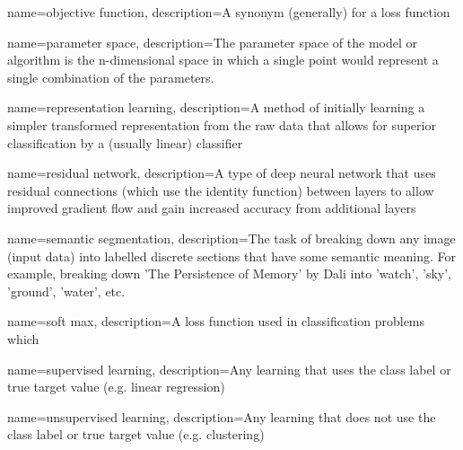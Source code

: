 {
    name={objective function},
    description={A synonym (generally) for a loss function \cite[p.~80]{good_fellow_2016}}
}

{
    name={parameter space},
    description={The parameter space of the model or algorithm is the n-dimensional space in which a single point would represent a single combination of the parameters.}
}

{
    name=representation learning,
    description={A method of initially learning a simpler transformed representation from the raw data that allows for superior classification by a (usually linear) classifier}
}

{
    name=residual network,
    description={A type of deep neural network that uses residual connections (which use the identity function) between layers to allow improved gradient flow and gain increased accuracy from additional layers}
}

{
    name=semantic segmentation,
    description={The task of breaking down any image (input data) into labelled discrete sections that have some semantic meaning. For example, breaking down 'The Persistence of Memory' by Dali into 'watch', 'sky', 'ground', 'water', etc.}
}

{
    name=soft max,
    description={A loss function used in classification problems which } %
}

{
    name=supervised learning,
    description={Any learning that uses the class label or true target value (e.g. linear regression)}
}

{
    name=unsupervised learning,
    description={Any learning that does not use the class label or true target value (e.g. clustering)}
}

